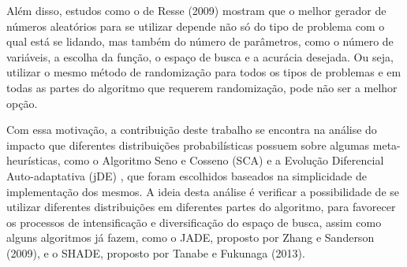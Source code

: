 
Além disso, estudos como o de Resse (2009) mostram que o melhor gerador de números aleatórios para se utilizar depende não só do tipo de problema com o qual está se lidando, mas também do número de parâmetros, como o número de variáveis, a escolha da função, o espaço de busca e a acurácia desejada. Ou seja, utilizar o mesmo método de randomização para todos os tipos de problemas e em todas as partes do algoritmo que requerem randomização, pode não ser a melhor opção.

Com essa motivação, a contribuição deste trabalho se encontra na análise do impacto que diferentes distribuições probabilísticas possuem sobre algumas meta-heurísticas, como o Algoritmo Seno e Cosseno (SCA) \cite{mirjalili} e a Evolução Diferencial Auto-adaptativa (jDE) \cite{brest}, que foram escolhidos baseados na simplicidade de implementação dos mesmos. A ideia desta análise é verificar a possibilidade de se utilizar diferentes distribuições em diferentes partes do algoritmo, para favorecer os processos de intensificação e diversificação do espaço de busca, assim como alguns algoritmos já fazem, como o JADE, proposto por Zhang e Sanderson (2009), e o SHADE, proposto por Tanabe e Fukunaga (2013).





